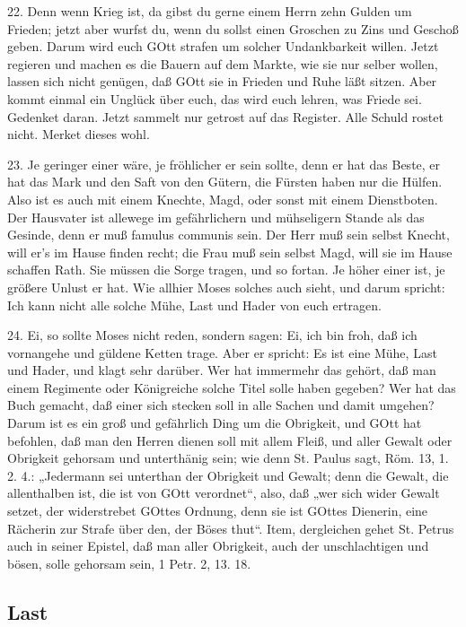 22. Denn wenn Krieg ist, da gibst du gerne einem Herrn zehn Gulden um Frieden; jetzt aber wurfst du, wenn du sollst einen Groschen zu Zins und Geschoß geben. Darum wird euch GOtt strafen um solcher Undankbarkeit willen. Jetzt regieren und machen es die Bauern auf dem Markte, wie sie nur selber wollen, lassen sich nicht genügen, daß GOtt sie in Frieden und Ruhe läßt sitzen. Aber kommt einmal ein Unglück über euch, das wird euch lehren, was Friede sei. Gedenket daran. Jetzt sammelt nur getrost auf das Register. Alle Schuld rostet nicht. Merket dieses wohl.

23. Je geringer einer wäre, je fröhlicher er sein sollte, denn er hat das Beste, er hat das Mark und den Saft von den Gütern, die Fürsten haben nur die Hülfen. Also ist es auch mit einem Knechte, Magd, oder sonst mit einem Dienstboten. Der Hausvater ist allewege im gefährlichern und mühseligern Stande als das Gesinde, denn er muß famulus communis sein. Der Herr muß sein selbst Knecht, will er’s im Hause finden recht; die Frau muß sein selbst Magd, will sie im Hause schaffen Rath. Sie müssen die Sorge tragen, und so fortan. Je höher einer ist, je größere Unlust er hat. Wie allhier Moses solches auch sieht, und darum spricht: Ich kann nicht alle solche Mühe, Last und Hader von euch ertragen.

24. Ei, so sollte Moses nicht reden, sondern sagen: Ei, ich bin froh, daß ich vornangehe und güldene Ketten trage. Aber er spricht: Es ist eine Mühe, Last und Hader, und klagt sehr darüber. Wer hat immermehr das gehört, daß man einem Regimente oder Königreiche solche Titel solle haben gegeben? Wer hat das Buch gemacht, daß einer sich stecken soll in alle Sachen und damit umgehen? Darum ist es ein groß und gefährlich Ding um die Obrigkeit, und GOtt hat befohlen, daß man den Herren dienen soll mit allem Fleiß, und aller Gewalt oder Obrigkeit gehorsam und unterthänig sein; wie denn St. Paulus sagt, Röm. 13, 1. 2. 4.: „Jedermann sei unterthan der Obrigkeit und Gewalt; denn die Gewalt, die allenthalben ist, die ist von GOtt verordnet“, also, daß „wer sich wider Gewalt setzet, der widerstrebet GOttes Ordnung, denn sie ist GOttes Dienerin, eine Rächerin zur Strafe über den, der Böses thut“. Item, dergleichen gehet St. Petrus auch in seiner Epistel, daß man aller Obrigkeit, auch der unschlachtigen und bösen, solle gehorsam sein, 1 Petr. 2, 13. 18.

\subsection{Last}

